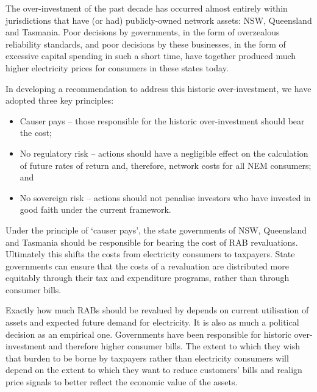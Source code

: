 \documentclass[FrontPage]{grattan}
\begin{document}
The over-investment of the past decade has occurred almost entirely within jurisdictions that have (or had) publicly-owned network assets: NSW, Queensland and Tasmania. Poor decisions by governments, in the form of overzealous reliability standards, and poor decisions by these businesses, in the form of excessive capital spending in such a short time, have together produced much higher electricity prices for consumers in these states today. 

In developing a recommendation to address this historic over-investment, we have adopted three key principles:

\begin{itemize}
 \item Causer pays -- those responsible for the historic over-investment should bear the cost;
 \item No regulatory risk -- actions should have a negligible effect on the calculation of future rates of return and, therefore, network costs for all NEM consumers; and
 \item No sovereign risk -- actions should not penalise investors who have invested in good faith under the current framework. 
\end{itemize}

Under the principle of `causer pays', the state governments of NSW, Queensland and Tasmania should be responsible for bearing the cost of RAB revaluations. Ultimately this shifts the costs from electricity consumers to taxpayers. State governments can ensure that the costs of a revaluation are distributed more equitably through their tax and expenditure programs, rather than through consumer bills. 

Exactly how much RABs should be revalued by depends on current utilisation of assets and expected future demand for electricity. It is also as much a political decision as an empirical one. Governments have been responsible for historic over-investment and therefore higher consumer bills. The extent to which they wish that burden to be borne by taxpayers rather than electricity consumers will depend on the extent to which they want to reduce customers' bills and realign price signals to better reflect the economic value of the assets. 
\end{document}
